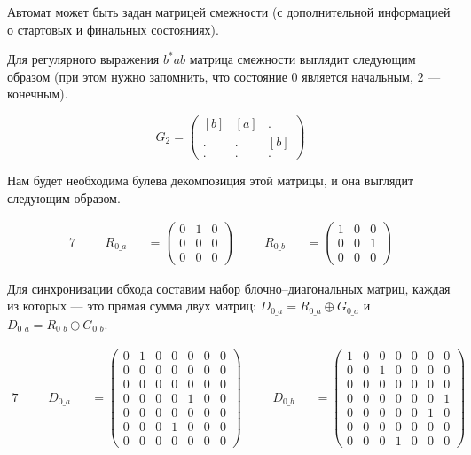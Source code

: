 \begin{example}
Автомат может быть задан матрицей смежности (с дополнительной информацией о стартовых и финальных состояниях).

Для регулярного выражения $b^*ab$ матрица смежности выглядит следующим образом (при этом нужно запомнить, что
состояние $0$ является начальным, $2$ --- конечным).

\[ G_2 =
\begin{pmatrix}
[b] & [a] & . \\
. & . & [b] \\
. & . & . 
\end{pmatrix}
\]

Нам будет необходима булева декомпозиция этой матрицы, и она выглядит следующим образом.

\begin{alignat*}{7}
  & &&R_{0\_a} &&= \begin{pmatrix}
    0 & 1 & 0 \\
    0 & 0 & 0 \\
    0 & 0 & 0 
    \end{pmatrix} \ \ \ \ &&R_{0\_b} &&= \begin{pmatrix}
      1 & 0 & 0 \\
      0 & 0 & 1 \\
      0 & 0 & 0 
      \end{pmatrix}
\end{alignat*}

Для синхронизации обхода составим набор блочно--диагональных матриц, каждая из которых --- это прямая сумма двух матриц:
$D_{0\_a} = R_{0\_a} \oplus G_{0\_a}$ и $D_{0\_a} = R_{0\_b} \oplus G_{0\_b}$.

\begin{alignat*}{7}
  & &&D_{0\_a} &&= \begin{pmatrix}
    0 & 1 & 0 & 0 & 0 & 0 & 0 \\
    0 & 0 & 0 & 0 & 0 & 0 & 0 \\
    0 & 0 & 0 & 0 & 0 & 0 & 0 \\
    0 & 0 & 0 & 0 & 1 & 0 & 0 \\
    0 & 0 & 0 & 0 & 0 & 0 & 0 \\
    0 & 0 & 0 & 1 & 0 & 0 & 0 \\
    0 & 0 & 0 & 0 & 0 & 0 & 0 
    \end{pmatrix} \ \ \ \ &&D_{0\_b} &&= \begin{pmatrix}
      1 & 0 & 0 & 0 & 0 & 0 & 0 \\
      0 & 0 & 1 & 0 & 0 & 0 & 0 \\
      0 & 0 & 0 & 0 & 0 & 0 & 0 \\
      0 & 0 & 0 & 0 & 0 & 0 & 1 \\
      0 & 0 & 0 & 0 & 0 & 1 & 0 \\
      0 & 0 & 0 & 0 & 0 & 0 & 0 \\
      0 & 0 & 0 & 1 & 0 & 0 & 0 
      \end{pmatrix}
\end{alignat*}


\end{example}
